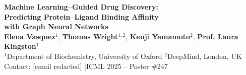 \documentclass[a0paper,portrait]{article}
\begin{document}

\vspace*{-1cm}
\begin{center}
  {\color{white}\fontsize{80}{96}\selectfont\bfseries
  Machine Learning--Guided Drug Discovery:\\[0.4cm]
  Predicting Protein--Ligand Binding Affinity\\[0.4cm]
  with Graph Neural Networks}\\[2cm]
  {\color{white}\fontsize{40}{48}\selectfont
  \textbf{Elena Vasquez}$^1$, \textbf{Thomas Wright}$^{1,2}$, \textbf{Kenji Yamamoto}$^2$, \textbf{Prof. Laura Kingston}$^1$}\\[1cm]
  {\color{white!85}\fontsize{34}{42}\selectfont
  $^1$Department of Biochemistry, University of Oxford \quad\quad
  $^2$DeepMind, London, UK}\\[0.6cm]
  {\color{accentblue!40}\fontsize{30}{36}\selectfont
  Contact: [email redacted] \quad|\quad ICML 2025 -- Poster \#247}
\end{center}

\vspace{3cm}
\end{document}
